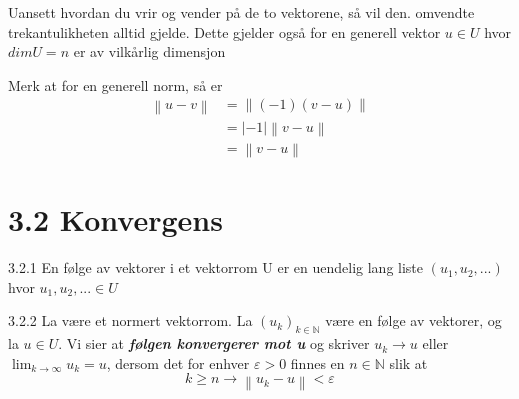 \documentclass[a4paper,norsk]{article}
\renewcommand{\geq}{\geqslant}
\newcommand{\eps} {\varepsilon}
\begin{document}
Uansett hvordan du vrir og vender på de to vektorene, så vil den. omvendte trekantulikheten alltid gjelde. Dette gjelder også for en generell vektor $ u \in U $ hvor $ dimU = n $ er av vilkårlig dimensjon

Merk at for en generell norm, så er 
\begin{align*}
    \left\lVert u - v \right\rVert &= \left\lVert \left( -1 \right) \left( v - u \right) \right\rVert \\
    &= \left| -1 \right| \left\lVert v-u \right\rVert \\
    &= \left\lVert v-u \right\rVert 
\end{align*}


\section*{3.2 Konvergens}

\begin{definitionbox}{3.2.1}{}
En følge av vektorer i et vektorrom U er en uendelig lang liste $ \left( u_1, u_2, ... \right)  $ hvor $ u_1, u_2, ... \in  U $ 
\end{definitionbox}

\begin{definitionbox}{3.2.2}{}
La  være et normert vektorrom. La $ \left( u_k \right) _{k \in \mathbb{N}} $ være en følge av vektorer, og la $ u \in U $. Vi sier at \textbf{\textit{følgen konvergerer mot u }} og skriver $ u_k \to u $ eller $ \lim_{k \to \infty} u_k = u $, dersom det for enhver $ \eps > 0 $ finnes en $ n \in \mathbb{N} $ slik at 
\[
    k \geq n \rightarrow \left\lVert u_k - u \right\rVert < \eps
\]
\end{definitionbox}
\end{document}
